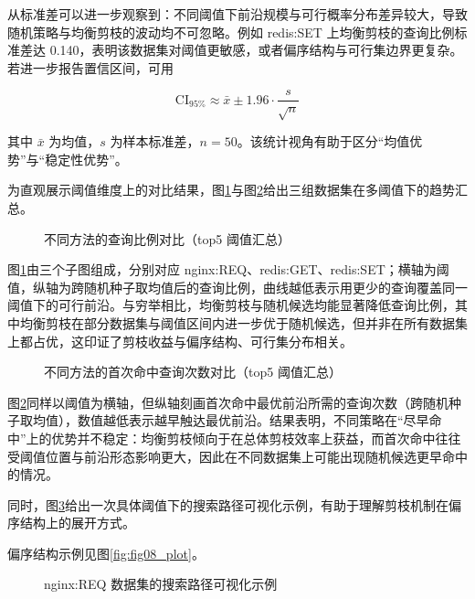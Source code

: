 \documentclass[UTF8,a4paper,12pt]{ctexart}
\numberwithin{equation}{section}
\begin{document}
从标准差可以进一步观察到：不同阈值下前沿规模与可行概率分布差异较大，导致随机策略与均衡剪枝的波动均不可忽略。例如
redis:SET 上均衡剪枝的查询比例标准差达
0.140，表明该数据集对阈值更敏感，或者偏序结构与可行集边界更复杂。若进一步报告置信区间，可用

\begin{equation}
\text{CI}_{95\%} \approx \bar{x} \pm 1.96\cdot \frac{s}{\sqrt{n}}
\end{equation}

其中 \(\bar{x}\) 为均值，\(s\)
为样本标准差，\(n=50\)。该统计视角有助于区分``均值优势''与``稳定性优势''。

为直观展示阈值维度上的对比结果，图\ref{fig:query-ratio-top5}与图\ref{fig:first-hit-top5}给出三组数据集在多阈值下的趋势汇总。

\begin{figure}
  \centering
  
  \caption{不同方法的查询比例对比（top5 阈值汇总）}
  \label{fig:query-ratio-top5}
\end{figure}

图\ref{fig:query-ratio-top5}由三个子图组成，分别对应 nginx:REQ、redis:GET、redis:SET；横轴为阈值，纵轴为跨随机种子取均值后的查询比例，曲线越低表示用更少的查询覆盖同一阈值下的可行前沿。与穷举相比，均衡剪枝与随机候选均能显著降低查询比例，其中均衡剪枝在部分数据集与阈值区间内进一步优于随机候选，但并非在所有数据集上都占优，这印证了剪枝收益与偏序结构、可行集分布相关。

\begin{figure}
  \centering
  
  \caption{不同方法的首次命中查询次数对比（top5 阈值汇总）}
  \label{fig:first-hit-top5}
\end{figure}

图\ref{fig:first-hit-top5}同样以阈值为横轴，但纵轴刻画首次命中最优前沿所需的查询次数（跨随机种子取均值），数值越低表示越早触达最优前沿。结果表明，不同策略在``尽早命中''上的优势并不稳定：均衡剪枝倾向于在总体剪枝效率上获益，而首次命中往往受阈值位置与前沿形态影响更大，因此在不同数据集上可能出现随机候选更早命中的情况。

同时，图\ref{fig:nginx-search-path}给出一次具体阈值下的搜索路径可视化示例，有助于理解剪枝机制在偏序结构上的展开方式。

偏序结构示例见图\ref{fig:fig08_plot}。

\begin{figure}
  \centering
  
  \caption{nginx:REQ 数据集的搜索路径可视化示例}
  \label{fig:nginx-search-path}
\end{figure}
\end{document}
